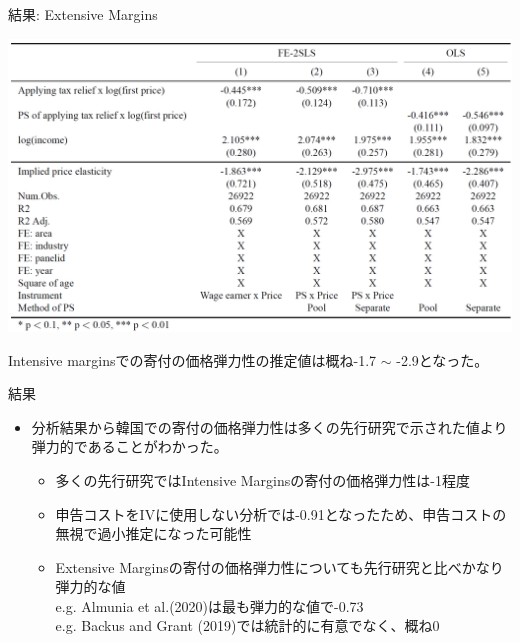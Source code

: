 \documentclass[dvipdfmx,10pt]{beamer}
\begin{document}
\begin{frame}{結果: Extensive Margins}
	\begin{table}
		\centering
		\includegraphics[width=0.9\linewidth]{Tab_res_2}
		\caption{First-Price Elasticities (Extensive Margins)}
		\label{tab:3}
	\end{table}
	Intensive marginsでの寄付の価格弾力性の推定値は概ね-1.7 $\sim$ -2.9となった。
\end{frame}

\begin{frame}{結果}
	\begin{itemize}
		\item 分析結果から韓国での寄付の価格弾力性は多くの先行研究で示された値より弾力的であることがわかった。
		\begin{itemize}
			\item 多くの先行研究ではIntensive Marginsの寄付の価格弾力性は-1程度
			\item 申告コストをIVに使用しない分析では-0.91となったため、申告コストの無視で過小推定になった可能性
		  	\item Extensive Marginsの寄付の価格弾力性についても先行研究と比べかなり弾力的な値\\
		  	e.g. Almunia et al.(2020)は最も弾力的な値で-0.73\\
		  	e.g. Backus and Grant (2019)では統計的に有意でなく、概ね0
		  \end{itemize}
	\end{itemize}
\end{frame}
\end{document}

